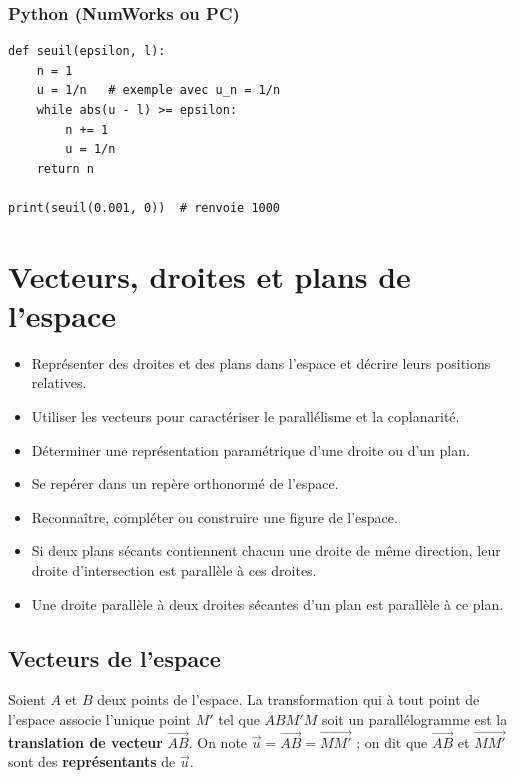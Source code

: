 \documentclass[11pt,a4paper,openany]{book}
\theoremstyle{definition}
\newcommand{\vc}[1]{\overrightarrow{#1}}
\newcommand{\nchap}{
    \setcounter{Définition}{0}
    \setcounter{Propriété}{0}
    \setcounter{Théorème}{0}
    \setcounter{Remarque}{0}
    \setcounter{Exemple}{0}
}
\begin{document}
    \subsection*{Python (NumWorks ou PC)}
    \begin{verbatim}
def seuil(epsilon, l):
    n = 1
    u = 1/n   # exemple avec u_n = 1/n
    while abs(u - l) >= epsilon:
        n += 1
        u = 1/n
    return n

print(seuil(0.001, 0))  # renvoie 1000
    \end{verbatim}

    \chapter{Vecteurs, droites et plans de l'espace}
    \nchap

    \begin{capacitesbox}
    \begin{itemize}
        \item Représenter des droites et des plans dans l'espace et décrire leurs positions relatives.
        \item Utiliser les vecteurs pour caractériser le parallélisme et la coplanarité.
        \item Déterminer une représentation paramétrique d'une droite ou d'un plan.
        \item Se repérer dans un repère orthonormé de l'espace.
        \item Reconnaître, compléter ou construire une figure de l'espace.
    \end{itemize}
    \end{capacitesbox}

    \begin{demoprogbox}
    \begin{itemize}
        \item Si deux plans sécants contiennent chacun une droite de même direction, leur droite
              d'intersection est parallèle à ces droites.
        \item Une droite parallèle à deux droites sécantes d'un plan est parallèle à ce plan.
    \end{itemize}
    \end{demoprogbox}

    \section{Vecteurs de l'espace}
    \begin{Définition}
        Soient $A$ et $B$ deux points de l'espace. La transformation qui à tout point de
        l'espace associe l'unique point $M'$ tel que $ABM'M$ soit un parallélogramme est la
        \textbf{translation de vecteur} $\vc{AB}$.
        On note $\vc{u}=\vc{AB}=\vc{MM'}$ ; on dit que $\vc{AB}$ et $\vc{MM'}$ sont des
        \textbf{représentants} de $\vc{u}$.
    \end{Définition}
\end{document}

